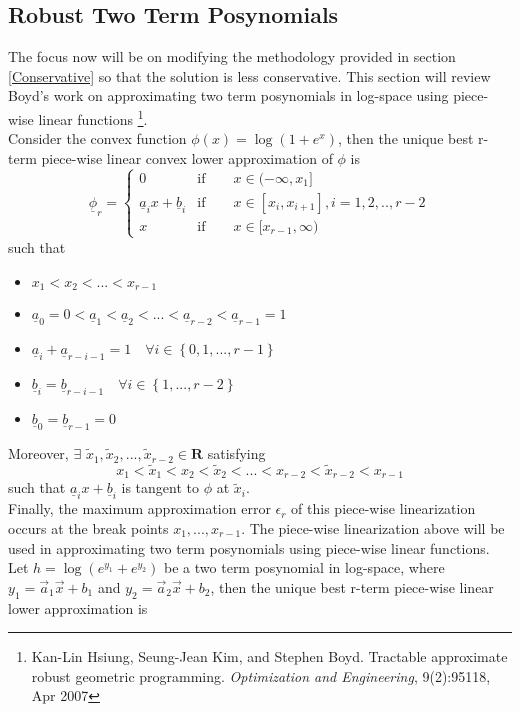 \subsection{Robust Two Term Posynomials} \label{twoTerm}
The focus now will be on modifying the methodology provided in section \ref{Conservative}
so that the solution is less conservative. This section will review Boyd's work on approximating two term
posynomials in log-space using piece-wise linear functions \footnote{ Kan-Lin Hsiung, Seung-Jean Kim, and Stephen Boyd.
Tractable approximate robust geometric programming. \textit{Optimization and Engineering}, 9(2):95118, Apr 2007}.\\[12pt]
Consider the convex function $\phi(x) = \log(1 + e^x)$, then the unique best r-term piece-wise linear convex lower approximation of $\phi$ is
\begin{equation}
\underline{\phi}_r =
\begin{cases}
0 \qquad &\text{if} \qquad x \in (- \infty, x_1]\\
\underline{a}_ix + \underline{b}_i &\text{if} \qquad x \in [x_i, x_{i+1}], i=1,2,..,r-2\\
x &\text{if} \qquad x \in [x_{r-1}, \infty)
\end{cases}
\label{lower_phi}
\end{equation}
such that
\begin{itemize}
\item $x_1 < x_2 < ... < x_{r-1}$
\item $\underline{a}_0 = 0 < \underline{a}_1 < \underline{a}_2 < ... < \underline{a}_{r-2} < \underline{a}_{r-1} = 1$
\item $\underline{a}_i + \underline{a}_{r-i-1} = 1\quad \forall i \in \left\{0,1, ..., r-1\right\}$
\item $\underline{b}_i = \underline{b}_{r-i-1} \quad \forall i \in \left\{1, ..., r-2\right\}$
\item $\underline{b}_0 = \underline{b}_{r-1} = 0$
\end{itemize}
Moreover, $\exists$ $\tilde{x}_1, \tilde{x}_2, ..., \tilde{x}_{r-2} \in \mathbf{R}$ satisfying
$$
x_1 < \tilde{x}_1 < x_2 < \tilde{x}_2 < ... < x_{r-2} < \tilde{x}_{r-2} < x_{r-1}
$$
such that $\underline{a}_ix + \underline{b}_i$ is tangent to $\phi$ at $\tilde{x}_i$.\\
Finally, the maximum approximation error $\epsilon_r$ of this piece-wise linearization occurs at the break points $x_1, ..., x_{r-1}$. The piece-wise linearization above will be used in approximating two term posynomials using piece-wise linear functions.\\[12pt]
Let $h= \log(e^{y_1} + e^{y_2})$ be a two term posynomial in log-space, where $y_1 = \vec{a}_1\vec{x} + b_1$ and $y_2 = \vec{a}_2\vec{x} + b_2$, then the unique best r-term piece-wise linear lower approximation is

